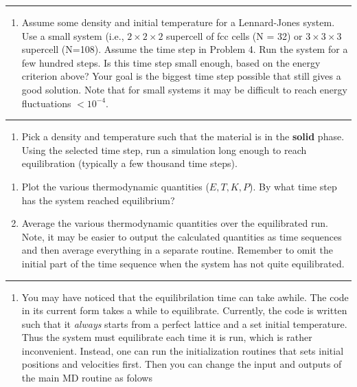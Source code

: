 \documentclass[11pt]{article}
\providecommand{\tightlist}{%
      \setlength{\itemsep}{0pt}\setlength{\parskip}{0pt}}
\begin{document}
\begin{center}\rule{0.5\linewidth}{0.5pt}\end{center}

    \begin{enumerate}
\def\labelenumi{\arabic{enumi}.}
\setcounter{enumi}{4}
\tightlist
\item
  Assume some density and initial temperature for a Lennard-Jones
  system. Use a small system (i.e., \(2\times 2\times 2\) supercell of
  fcc cells (N = 32) or \(3 \times 3 \times 3\) supercell (N=108).
  Assume the time step in Problem 4. Run the system for a few hundred
  steps. Is this time step small enough, based on the energy criterion
  above? Your goal is the biggest time step possible that still gives a
  good solution. Note that for small systems it may be difficult to
  reach energy fluctuations \(< 10^{-4}\).
\end{enumerate}

\begin{center}\rule{0.5\linewidth}{0.5pt}\end{center}

    \begin{enumerate}
\def\labelenumi{\arabic{enumi}.}
\setcounter{enumi}{5}
\tightlist
\item
  Pick a density and temperature such that the material is in the
  \textbf{solid} phase. Using the selected time step, run a simulation
  long enough to reach equilibration (typically a few thousand time
  steps).
\end{enumerate}

\begin{enumerate}
\def\labelenumi{\alph{enumi})}
\item
  Plot the various thermodynamic quantities (\(E, T, K, P\)). By what
  time step has the system reached equilibrium?
\item
  Average the various thermodynamic quantities over the equilibrated
  run. Note, it may be easier to output the calculated quantities as
  time sequences and then average everything in a separate routine.
  Remember to omit the initial part of the time sequence when the system
  has not quite equilibrated.
\end{enumerate}

\begin{center}\rule{0.5\linewidth}{0.5pt}\end{center}

    \begin{enumerate}
\def\labelenumi{\arabic{enumi}.}
\setcounter{enumi}{6}
\tightlist
\item
  You may have noticed that the equilibrilation time can take awhile.
  The code in its current form takes a while to equilibrate. Currently,
  the code is written such that it \emph{always} starts from a perfect
  lattice and a set initial temperature. Thus the system must
  equilibrate each time it is run, which is rather inconvenient.
  Instead, one can run the initialization routines that sets initial
  positions and velocities first. Then you can change the input and
  outputs of the main MD routine as folows
\end{enumerate}
\end{document}
